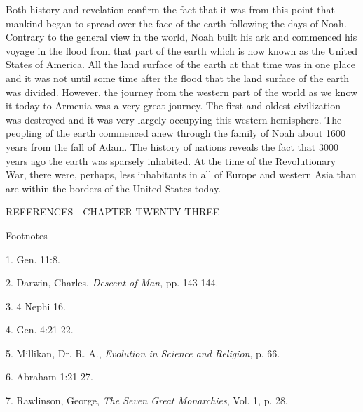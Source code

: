 Both history and revelation confirm the fact that it was from this point that mankind began to
spread over the face of the earth following the days of Noah. Contrary to the general view in
the world, Noah built his ark and commenced his voyage in the flood from that part of the
earth which is now known as the United States of America. All the land surface of the earth
at that time was in one place and it was not until some time after the flood that the land
surface of the earth was divided. However, the journey from the western part of the world as
we know it today to Armenia was a very great journey. The first and oldest civilization was
destroyed and it was very largely occupying this western hemisphere. The peopling of the
earth commenced anew through the family of Noah about 1600 years from the fall of Adam.
The history of nations reveals the fact that 3000 years ago the earth was sparsely inhabited.
At the time of the Revolutionary War, there were, perhaps, less inhabitants in all of Europe
and western Asia than are within the borders of the United States today.

\newpage
REFERENCES—CHAPTER TWENTY-THREE

Footnotes

1. Gen. 11:8.

2. Darwin, Charles, \textit{Descent of Man}, pp. 143-144.

3. 4 Nephi 16.

4. Gen. 4:21-22.

5. Millikan, Dr. R. A., \textit{Evolution in Science and Religion}, p. 66.

6. Abraham 1:21-27.

7. Rawlinson, George, \textit{The Seven Great Monarchies}, Vol. 1, p. 28.

